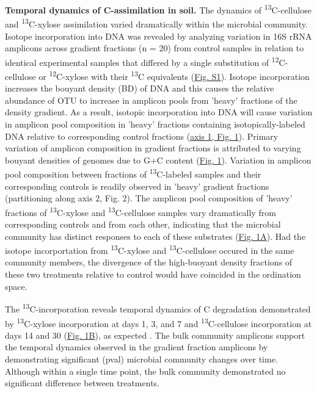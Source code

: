 \textbf{Temporal dynamics of C-assimilation in soil.}  
The dynamics of \textsuperscript{13}C-cellulose and \textsuperscript{13}C-xylose assimilation varied dramatically within the microbial community. Isotope incorporation into DNA was revealed by analyzing variation in 16S rRNA amplicons across gradient fractions (n = 20) from control samples in relation to identical experimental samples that differed by a single substitution of \textsuperscript{12}C-cellulose or \textsuperscript{12}C-xylose with their \textsuperscript{13}C equivalents (\href{https://www.authorea.com/users/3537/articles/8459/master/file/figures/20140708_ConceptualFig2/20140708_ConceptualFig2.pdf}{Fig. S1}). Isotope incorporation increases the bouyant density (BD) of DNA and this causes the relative abundance of OTU to increase in amplicon pools from 'heavy' fractions of the density gradient. As a result, isotopic incorporation into DNA will cause variation in amplicon pool composition in 'heavy' fractions containing isotopically-labeled DNA relative to corresponding control fractions (\href{https://www.authorea.com/users/3537/articles/3612/master/file/figures/ordination_all1/ordination_all1.png}{axis 1, Fig. 1}). Primary variation of amplicon composition in gradient fractions is attributed to varying bouyant densities of genomes due to G+C content (\href{https://www.authorea.com/users/3537/articles/3612/master/file/figures/ordination_all1/ordination_all1.png}{Fig. 1}). Variation in amplicon pool composition between fractions of \textsuperscript{13}C-labeled samples and their corresponding controls is readily observed in 'heavy' gradient fractions (partitioning along axis 2, Fig. 2). The amplicon pool composition of 'heavy' fractions of \textsuperscript{13}C-xylose and \textsuperscript{13}C-cellulose samples vary dramatically from corresponding controls and from each other, indicating that the microbial community has distinct responses to each of these substrates (\href{https://www.authorea.com/users/3537/articles/3612/master/file/figures/ordination_all1/ordination_all1.png}{Fig. 1A}). Had the isotope incorportation from \textsuperscript{13}C-xylose and \textsuperscript{13}C-cellulose occured in the same community members, the divergence of the high-buoyant density fractions of these two treatments relative to control would have coincided in the ordination space.  

The \textsuperscript{13}C-incorporation reveals temporal dynamics of C degradation demonstrated by \textsuperscript{13}C-xylose incorporation at days 1, 3, and 7 and \textsuperscript{13}C-cellulose incorporation at days 14 and 30 (\href{https://www.authorea.com/users/3537/articles/3612/master/file/figures/ordination_all1/ordination_all1.png}{Fig. 1B}), as expected \cite{Amelung_2008}. The bulk community amplicons support the temporal dynamics observed in the gradient fraction amplicons by demonstrating significant (pval) microbial community changes over time. Although within a single time point, the bulk community demonstrated no significant difference between treatments. 

